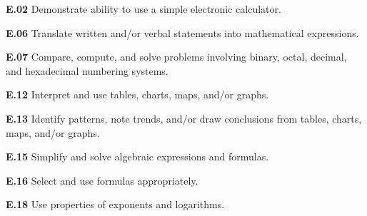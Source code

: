 \item{\bf E.02} Demonstrate ability to use a simple electronic calculator.
\item{\bf E.06} Translate written and/or verbal statements into mathematical expressions.
\item{\bf E.07} Compare, compute, and solve problems involving binary, octal, decimal, and hexadecimal numbering systems.
\item{\bf E.12} Interpret and use tables, charts, maps, and/or graphs.
\item{\bf E.13} Identify patterns, note trends, and/or draw conclusions from tables, charts, maps, and/or graphs.
\item{\bf E.15} Simplify and solve algebraic expressions and formulas.
\item{\bf E.16} Select and use formulas appropriately.
\item{\bf E.18} Use properties of exponents and logarithms.
\medskip


